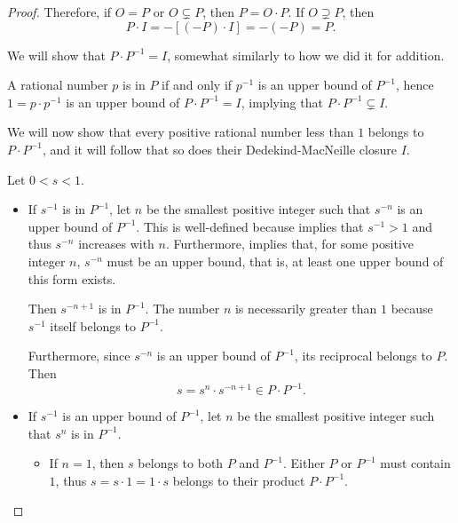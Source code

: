 \begin{proof}
  Therefore, if \( O = P \) or \( O \subsetneq P \), then \( P = O \cdot P \). If \( O \supsetneq P \), then
  \begin{equation*}
    P \cdot I = -[(-P) \cdot I] = -(-P) = P.
  \end{equation*}

   We will show that \( P \cdot P^{-1} = I \), somewhat similarly to how we did it for addition.

  A rational number \( p \) is in \( P \) if and only if \( p^{-1} \) is an upper bound of \( P^{-1} \), hence \( 1 = p \cdot p^{-1} \) is an upper bound of \( P \cdot P^{-1} = I \), implying that \( P \cdot P^{-1} \subsetneq I \).

  We will now show that every positive rational number less than \( 1 \) belongs to \( P \cdot P^{-1} \), and it will follow that so does their Dedekind-MacNeille closure \( I \).

   Let \( 0 < s < 1 \).
  \begin{itemize}
    \item If \( s^{-1} \) is in \( P^{-1} \), let \( n \) be the smallest positive integer such that \( s^{-n} \) is an upper bound of \( P^{-1} \). This is well-defined because  implies that \( s^{-1} > 1 \) and thus \( s^{-n} \) increases with \( n \). Furthermore,  implies that, for some positive integer \( n \), \( s^{-n} \) must be an upper bound, that is, at least one upper bound of this form exists.

    Then \( s^{-n+1} \) is in \( P^{-1} \). The number \( n \) is necessarily greater than \( 1 \) because \( s^{-1} \) itself belongs to \( P^{-1} \).

    Furthermore, since \( s^{-n} \) is an upper bound of \( P^{-1} \), its reciprocal belongs to \( P \). Then
    \begin{equation*}
      s = s^n \cdot s^{-n+1} \in P \cdot P^{-1}.
    \end{equation*}

    \item If \( s^{-1} \) is an upper bound of \( P^{-1} \), let \( n \) be the smallest positive integer such that \( s^n \) is in \( P^{-1} \).

    \begin{itemize}
      \item If \( n = 1 \), then \( s \) belongs to both \( P \) and \( P^{-1} \). Either \( P \) or \( P^{-1} \) must contain \( 1 \), thus \( s = s \cdot 1 = 1 \cdot s \) belongs to their product \( P \cdot P^{-1} \).


\end{itemize}
\end{itemize}
\end{proof}
